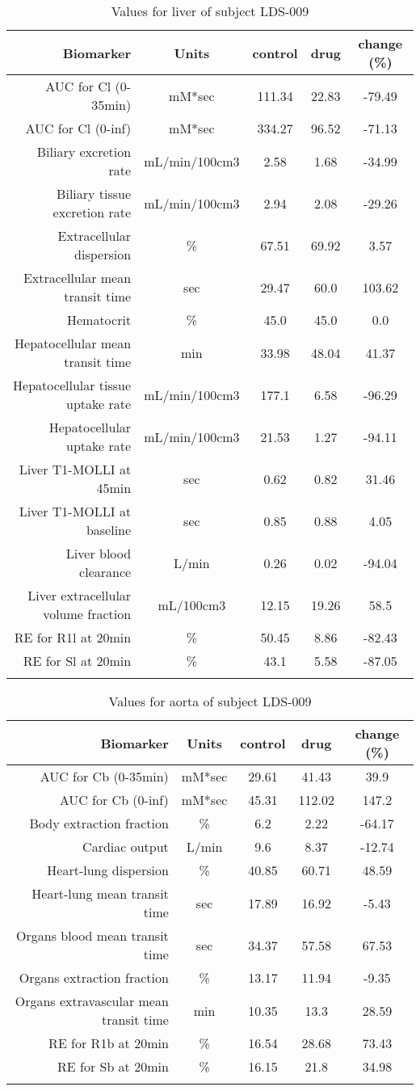 \documentclass{epflreport}%
\begin{document}
%
\clearpage%
\begin{longtable}{rcccc}%
\hline%
Biomarker&Units&control&drug&change (\%)\\%
\hline%
AUC for Cl (0{-}35min)&mM*sec&111.34&22.83&{-}79.49\\%
AUC for Cl (0{-}inf)&mM*sec&334.27&96.52&{-}71.13\\%
Biliary excretion rate&mL/min/100cm3&2.58&1.68&{-}34.99\\%
Biliary tissue excretion rate&mL/min/100cm3&2.94&2.08&{-}29.26\\%
Extracellular dispersion&\%&67.51&69.92&3.57\\%
Extracellular mean transit time&sec&29.47&60.0&103.62\\%
Hematocrit&\%&45.0&45.0&0.0\\%
Hepatocellular mean transit time&min&33.98&48.04&41.37\\%
Hepatocellular tissue uptake rate&mL/min/100cm3&177.1&6.58&{-}96.29\\%
Hepatocellular uptake rate&mL/min/100cm3&21.53&1.27&{-}94.11\\%
Liver T1{-}MOLLI at 45min&sec&0.62&0.82&31.46\\%
Liver T1{-}MOLLI at baseline&sec&0.85&0.88&4.05\\%
Liver blood clearance&L/min&0.26&0.02&{-}94.04\\%
Liver extracellular volume fraction&mL/100cm3&12.15&19.26&58.5\\%
RE for R1l at 20min&\%&50.45&8.86&{-}82.43\\%
RE for Sl at 20min&\%&43.1&5.58&{-}87.05\\%
\hline%
\caption{Values for liver of subject LDS-009} \\%
\end{longtable}%
\begin{longtable}{rcccc}%
\hline%
Biomarker&Units&control&drug&change (\%)\\%
\hline%
AUC for Cb (0{-}35min)&mM*sec&29.61&41.43&39.9\\%
AUC for Cb (0{-}inf)&mM*sec&45.31&112.02&147.2\\%
Body extraction fraction&\%&6.2&2.22&{-}64.17\\%
Cardiac output&L/min&9.6&8.37&{-}12.74\\%
Heart{-}lung dispersion&\%&40.85&60.71&48.59\\%
Heart{-}lung mean transit time&sec&17.89&16.92&{-}5.43\\%
Organs blood mean transit time&sec&34.37&57.58&67.53\\%
Organs extraction fraction&\%&13.17&11.94&{-}9.35\\%
Organs extravascular mean transit time&min&10.35&13.3&28.59\\%
RE for R1b at 20min&\%&16.54&28.68&73.43\\%
RE for Sb at 20min&\%&16.15&21.8&34.98\\%
\hline%
\caption{Values for aorta of subject LDS-009} \\%
\end{longtable}%
\clearpage%
\end{document}
